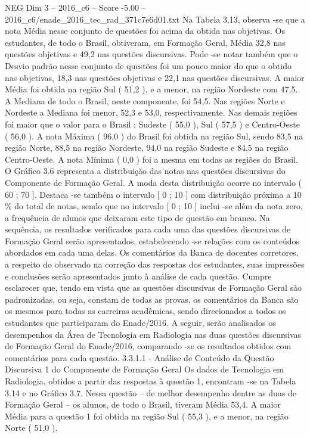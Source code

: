 \begin{textsample}{NEG Dim 3 – 2016\_c6 – Score -5.00 – 2016\_c6/enade\_2016\_tec\_rad\_371c7e6d01.txt}
Na Tabela 3.13, observa -se que a nota Média nesse conjunto de questões foi acima da obtida nas objetivas.
Os estudantes, de todo o Brasil, obtiveram, em Formação Geral, Média 32,8 nas questões objetivas e 49,2 nas questões discursivas.
Pode -se notar também que o Desvio padrão nesse conjunto de questões foi um pouco maior do que o obtido nas objetivas, 18,3 nas questões objetivas e 22,1 nas questões discursivas.
A maior Média foi obtida na região Sul ( 51,2 ), e a menor, na região Nordeste com 47,5.
A Mediana de todo o Brasil, neste componente, foi 54,5.
Nas regiões Norte e Nordeste a Mediana foi menor, 52,3 e 53,0, respectivamente.
Nas demais regiões foi maior que o valor para o Brasil : Sudeste ( 55,0 ), Sul ( 57,5 ) e Centro-Oeste ( 56,0 ).
A nota Máxima ( 96,0 ) do Brasil foi obtida na região Sul, sendo 83,5 na região Norte, 88,5 na região Nordeste, 94,0 na região Sudeste e 84,5 na região Centro-Oeste.
A nota Mínima ( 0,0 ) foi a mesma em todas as regiões do Brasil.
O Gráfico 3.6 representa a distribuição das notas nas questões discursivas do Componente de Formação Geral.
A moda desta distribuição ocorre no intervalo ( 60 ; 70 ].
Destaca -se também o intervalo [ 0 ; 10 ] com distribuição próxima a 10 \% do total de notas, sendo que no intervalo [ 0 ; 10 ] inclui -se além da nota zero, a frequência de alunos que deixaram este tipo de questão em branco.
Na sequência, os resultados verificados para cada uma das questões discursivas de Formação Geral serão apresentados, estabelecendo -se relações com os conteúdos abordados em cada uma delas.
Os comentários da Banca de docentes corretores, a respeito do observado na correção das respostas dos estudantes, suas impressões e conclusões serão apresentados junto à análise de cada questão.
Cumpre esclarecer que, tendo em vista que as questões discursivas de Formação Geral são padronizadas, ou seja, constam de todas as provas, os comentários da Banca são os mesmos para todas as carreiras acadêmicas, sendo direcionados a todos os estudantes que participaram do Enade/2016.
A seguir, serão analisados os desempenhos da Área de Tecnologia em Radiologia nas duas questões discursivas de Formação Geral do Enade/2016, comparando -se os resultados obtidos com comentários para cada questão. 3.3.1.1 - Análise de Conteúdo da Questão Discursiva 1 do Componente de Formação Geral Os dados de Tecnologia em Radiologia, obtidos a partir das respostas à questão 1, encontram -se na Tabela 3.14 e no Gráfico 3.7.
Nessa questão – de melhor desempenho dentre as duas de Formação Geral – os alunos, de todo o Brasil, tiveram Média 53,4.
A maior Média para a questão 1 foi obtida na região Sul ( 55,3 ), e a menor, na região Norte ( 51,0 ).

\end{textsample}
